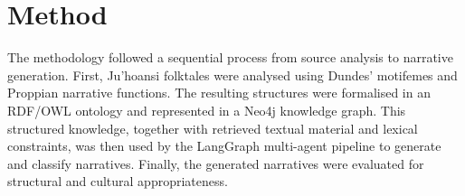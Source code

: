 \documentclass[pdflatex,sn-mathphys-num]{sn-jnl}%
\newcommand{\juhoansi}{\mbox{Ju\textbar{}'hoansi}}%
\theoremstyle{thmstyleone}%
\theoremstyle{thmstyletwo}%
\theoremstyle{thmstylethree}%
\begin{document}
\section{Method}\label{sec:theory}

The methodology followed a sequential process from source analysis to narrative generation. First, \juhoansi{} folktales were analysed using Dundes' motifemes and Proppian narrative functions. The resulting structures were formalised in an RDF/OWL ontology and represented in a Neo4j knowledge graph. This structured knowledge, together with retrieved textual material and lexical constraints, was then used by the LangGraph multi-agent pipeline to generate and classify narratives. Finally, the generated narratives were evaluated for structural and cultural appropriateness.




\end{document}
